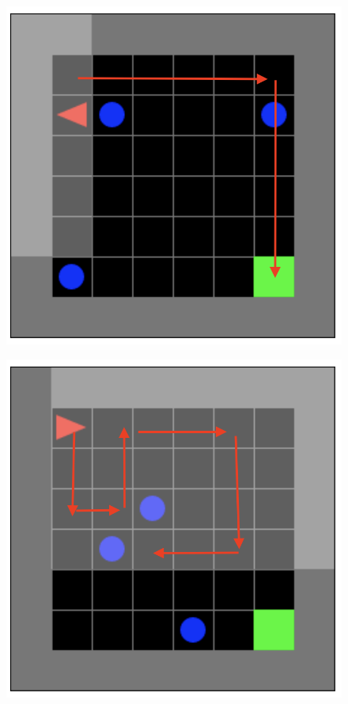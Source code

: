     \begin{figure}[H]
      \centering
      \begin{minipage}{.4\textwidth}
        \centering
        \includegraphics[width=1\linewidth]{figures/diopolicy.png}
        \label{fig:policydio}
      \end{minipage}%
      \begin{minipage}{.4\textwidth}
        \centering
        \includegraphics[width=1\linewidth]{figures/rlpolicy.png}
        \label{fig:policyrl}
      \end{minipage}
    \end{figure}

